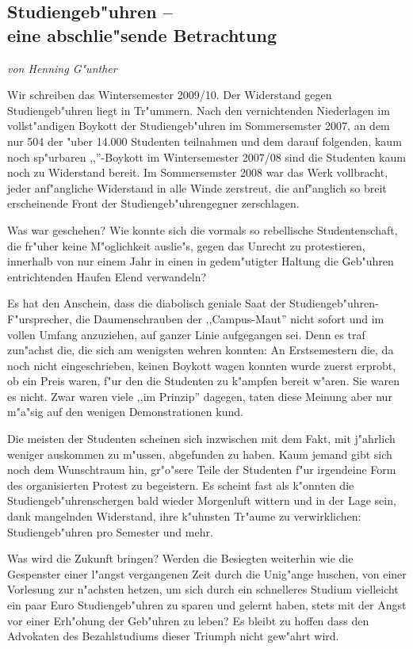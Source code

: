 \subsection[Studiengeb"uhren]{Studiengeb"uhren --\\ eine abschlie"sende
Betrachtung}
\emph{von Henning G"unther}


Wir schreiben das Wintersemester 2009/10.
Der Widerstand gegen Studiengeb"uhren liegt in Tr"ummern.
Nach den vernichtenden Niederlagen im voll\-st"an\-di\-gen Boykott der
Studiengeb"uhren im Sommersemster 2007, an dem nur 504 der "uber 14.000 Studenten teilnahmen und dem darauf folgenden, kaum noch sp"urbaren ,,''-Boykott im Wintersemester 2007/08 sind die Studenten kaum noch zu Widerstand bereit. Im Sommersemster 2008 war das Werk vollbracht, jeder anf"angliche Widerstand in alle Winde zerstreut, die anf"anglich so breit erscheinende Front der Studiengeb"uhrengegner zerschlagen.

Was war geschehen?
Wie konnte sich die vormals so rebellische Studentenschaft, die fr"uher keine M"oglichkeit auslie"s, gegen das Unrecht zu protestieren, innerhalb von nur einem Jahr in einen in gedem"utigter Haltung die Geb"uhren entrichtenden Haufen Elend verwandeln?

Es hat den Anschein, dass die diabolisch geniale Saat der
Studiengeb"uhren-F"ursprecher, die Daumenschrauben der ,,Campus-Maut'' nicht
sofort und im vollen Umfang anzuziehen, auf ganzer Linie aufgegangen sei. Denn es traf zun"achst die, die sich am wenigsten wehren konnten: An Erstsemestern die, da noch nicht eingeschrieben, keinen Boykott wagen
konnten wurde zuerst erprobt, ob  ein Preis waren, f"ur den die Studenten zu k"ampfen bereit w"aren. Sie waren es nicht.
Zwar waren viele ,,im Prinzip'' dagegen, taten diese Meinung aber nur m"a"sig
auf den wenigen Demonstrationen kund.

Die meisten der Studenten scheinen sich inzwischen mit dem Fakt, mit j"ahrlich
 weniger auskommen zu m"ussen, abgefunden zu haben. Kaum jemand gibt sich noch dem Wunschtraum hin, gr"o"sere Teile der Studenten f"ur irgendeine Form des organisierten Protest zu begeistern.
Es scheint fast als k"onnten die Studiengeb"uhrenschergen bald wieder Morgenluft wittern und in der Lage sein, dank mangelnden Widerstand, ihre k"uhnsten Tr"aume zu verwirklichen:  Studiengeb"uhren pro Semester und mehr.

Was wird die Zukunft bringen?
Werden die Besiegten weiterhin wie die Gespenster einer l"angst vergangenen Zeit durch die Unig"ange huschen, von einer Vorlesung zur n"achsten hetzen, um sich durch ein schnelleres Studium vielleicht ein paar Euro Studiengeb"uhren zu sparen und gelernt haben, stets mit der Angst vor einer Erh"ohung der Geb"uhren zu leben?
Es bleibt zu hoffen dass den Advokaten des Bezahlstudiums dieser Triumph nicht gew"ahrt wird.
